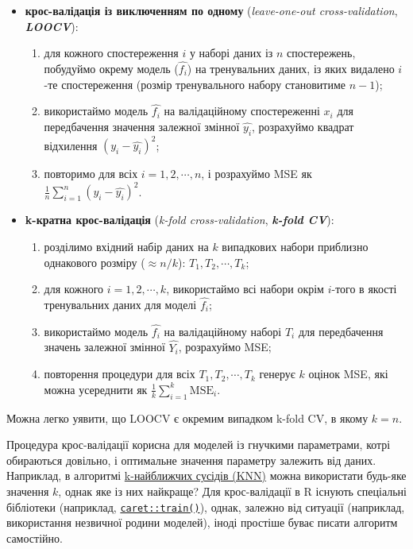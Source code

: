\documentclass[
  11pt,
]{book}
\begin{document}
\begin{itemize}
\item
  \textbf{крос-валідація із виключенням по одному} (\emph{leave-one-out cross-validation}, \textbf{\emph{LOOCV}}):

  \begin{enumerate}
  \def\labelenumi{\arabic{enumi})}
  \item
    для кожного спостереження \(i\) у наборі даних із \(n\) спостережень, побудуймо окрему модель (\(\hat{f_i}\)) на тренувальних даних, із яких видалено \(i\)-те спостереження (розмір тренувального набору становитиме \(n-1\));
  \item
    використаймо модель \(\hat{f_i}\) на валідаційному спостереженні \(x_i\) для передбачення значення залежної змінної \(\hat{y_i}\), розрахуймо квадрат відхилення \((y_i - \hat{y_i})^2\);
  \item
    повторимо для всіх \(i = 1, 2, \cdots, n\), і розрахуймо MSE як \(\frac{1}{n} \sum_{i = 1}^n ( y_i - \hat{y_i} )^2\).
  \end{enumerate}
\item
  \textbf{k-кратна крос-валідація} (\emph{k-fold cross-validation}, \textbf{\emph{k-fold CV}}):

  \begin{enumerate}
  \def\labelenumi{\arabic{enumi})}
  \item
    розділимо вхідний набір даних на \(k\) випадкових набори приблизно однакового розміру (\(\approx n/k\)): \(T_1, T_2, \cdots, T_k\);
  \item
    для кожного \(i = 1, 2, \cdots, k\), використаймо всі набори окрім \(i\)-того в якості тренувальних даних для моделі \(\hat{f_i}\);
  \item
    використаймо модель \(\hat{f_i}\) на валідаційному наборі \(T_i\) для передбачення значень залежної змінної \(\hat{Y_i}\), розрахуймо MSE;
  \item
    повторення процедури для всіх \(T_1, T_2, \cdots, T_k\) генерує \(k\) оцінок MSE, які можна усереднити як \(\frac{1}{k}\sum_{i=1}^k \text{MSE}_i\).
  \end{enumerate}
\end{itemize}

Можна легко уявити, що LOOCV є окремим випадком k-fold CV, в якому \(k=n\).

Процедура крос-валідації корисна для моделей із гнучкими параметрами, котрі обираються довільно, і оптимальне значення параметру залежить від даних. Наприклад, в алгоритмі \hyperref[classifier]{k-найближчих сусідів (KNN)} можна використати будь-яке значення \(k\), однак яке із них найкраще? Для крос-валідації в R існують спеціальні бібліотеки (наприклад, \href{https://rpubs.com/njvijay/16444}{\texttt{caret::train()}}), однак, залежно від ситуації (наприклад, використання незвичної родини моделей), іноді простіше буває писати алгоритм самостійно.
\end{document}
